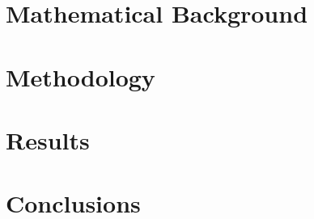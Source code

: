 \documentclass[mscthesis]{usiinfthesis}
\begin{document}
\chapter{Mathematical Background}\label{chap:mathematical-background}








\chapter{Methodology} \label{chap:methodology}







\chapter{Results} \label{chap:results}








\chapter{Conclusions} \label{chap:conclusions}



\appendix %

 
 

\backmatter
%
%



\end{document}
